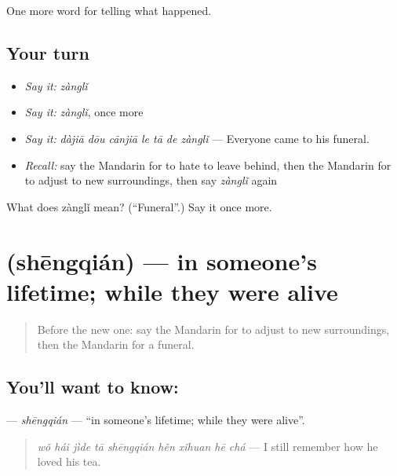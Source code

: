 \begin{grammarlens}[title={What you've built}]
One more word for telling what happened.
\end{grammarlens}

\subsection*{Your turn}
\begin{itemize}
\raggedright
  \item \emph{Say it:} \emph{zànglǐ}
  \item \emph{Say it:} \emph{zànglǐ}, once more
  \item \emph{Say it:} \emph{dàjiā dōu cānjiā le tā de zànglǐ} — Everyone came to his funeral.
  \item \emph{Recall:} say the Mandarin for to hate to leave behind, then the Mandarin for to adjust to new surroundings, then say \emph{zànglǐ} again
\end{itemize}

\begin{tcolorbox}[breakable,colback=teal!4,colframe=teal!35!black,title={Before you move on}]
What does zànglǐ mean? (\textquotedblleft{}Funeral\textquotedblright{}.) Say it once more.
\end{tcolorbox}
\section[\texorpdfstring{\zh{生前} (shēngqián)}{生前 (shēngqián)}]{ (shēngqián) — in someone's lifetime; while they were alive}

\label{lesson:ZH-C314-shengqian}



\begin{quote}
Before the new one: say the Mandarin for to adjust to new surroundings, then the Mandarin for a funeral.
\end{quote}

\subsection*{You'll want to know: }
\textbf{} — \emph{shēngqián} — \textquotedblleft{}in someone's lifetime; while they were alive\textquotedblright{}.

\begin{quote}
\textbf{} \emph{wǒ hái jìde tā shēngqián hěn xǐhuan hē chá} — I still remember how he loved his tea.
\end{quote}

